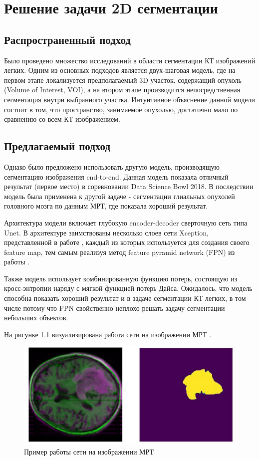 \chapter{Решение задачи 2D сегментации} 

  

\section{Распространенный подход} 
  

Было проведено множество исследований в области сегментации КТ изображений легких. Одним из основных подходов является двух-шаговая модель, где на первом этапе локализуется предполагаемый 3D участок, содержащий опухоль (Volume of Interest, VOI), а на втором этапе производится непосредственная сегментация внутри выбранного участка. Интуитивное объяснение данной модели состоит в том, что пространство, занимаемое опухолью, достаточно мало по сравнению со всем КТ изображением. 

  

\section{Предлагаемый подход} 


Однако было предложено использовать другую модель, производящую сегментацию изображения end-to-end. Данная модель показала отличный результат (первое место) в соревновании Data Science Bowl 2018. В последствии модель была применена к другой задаче - сегментации глиальных опухолей головного мозга по данным МРТ, где показала хороший результат. 


Архитектура модели включает глубокую encoder-decoder сверточную сеть типа Unet. В архитектуре заимствованы несколько слоев сети Xception, представленной в работе \cite{chollet2017xception}, каждый из которых используется для создания своего feature map, тем самым реализуя метод feature pyramid network (FPN) из работы \cite{lin2017feature}.

Также модель использует комбинированную функцию потерь, состоящую из кросс-энтропии наряду с мягкой функцией потерь Дайса. Ожидалось, что модель способна показать хороший результат и в задаче сегментации КТ легких, в том числе потому что FPN свойственно неплохо решать задачу сегментации небольших объектов.


На рисунке \ref{mri-sample} визуализирована работа сети на изображении МРТ \cite{unet-mri}. 

  

\begin{figure}[!h] 

\includegraphics[width=\linewidth]{images/mri-sample.png} 

\caption{Пример работы сети на изображении МРТ \cite{unet-mri}}\label{mri-sample} 

\centering 

\end{figure} 